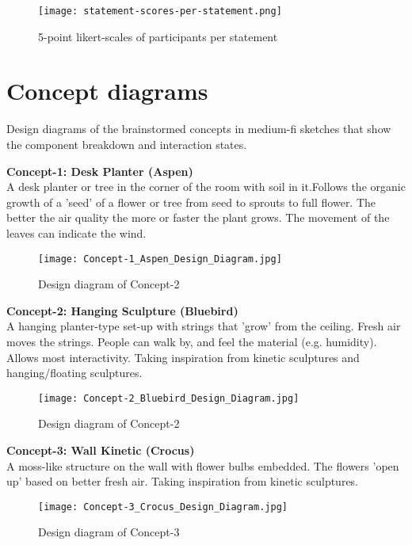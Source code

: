 \begin{appendices}
\begin{figure}[H]
    \centering
    \texttt{[image: statement-scores-per-statement.png]}
    \caption{5-point likert-scales of participants per statement}
    \label{fig:timeline}
\end{figure}


\newpage

\section{Concept diagrams}
\label{appendix:conceptdiagrams}

Design diagrams of the brainstormed concepts in medium-fi sketches that show the component breakdown and interaction states.

\textbf{Concept-1: Desk Planter (Aspen)}\\
A desk planter or tree in the corner of the room with soil in it.Follows the organic growth of a 'seed' of a flower or tree from seed to sprouts to full flower. The better the air quality the more or faster the plant grows. The movement of the leaves can indicate the wind.


\begin{figure}[H]
    \centering
    \texttt{[image: Concept-1\_Aspen\_Design\_Diagram.jpg]}
    \caption{Design diagram of Concept-2}
    \label{fig:timeline}
\end{figure}

\textbf{Concept-2: Hanging Sculpture (Bluebird)}\\
A hanging planter-type set-up with strings that 'grow' from the ceiling. Fresh air moves the strings. People can walk by, and feel the material (e.g. humidity). Allows most interactivity. Taking inspiration from kinetic sculptures and hanging/floating sculptures.

\begin{figure}[H]
    \centering
    \texttt{[image: Concept-2\_Bluebird\_Design\_Diagram.jpg]}
    \caption{Design diagram of Concept-2}
    \label{fig:timeline}
\end{figure}

\newpage

\textbf{Concept-3: Wall Kinetic (Crocus)} \\
A moss-like structure on the wall with flower bulbs embedded. The flowers 'open up' based on better fresh air. Taking inspiration from kinetic sculptures.

\begin{figure}[H]
    \centering
    \texttt{[image: Concept-3\_Crocus\_Design\_Diagram.jpg]}
    \caption{Design diagram of Concept-3}
    \label{fig:timeline}
\end{figure}


\end{appendices}
